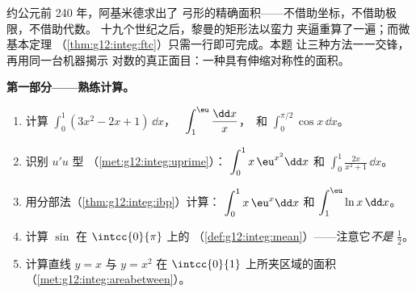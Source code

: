 \begin{problem}
\label{pb:g12:integ:1}
约公元前 240 年，阿基米德求出了
弓形的精确面积——不借助坐标，不借助极限，不借助代数。
十九个世纪之后，黎曼的矩形法以蛮力
夹逼重算了一遍；而微基本定理
（\cref{thm:g12:integ:ftc}）只需一行即可完成。本题
让三种方法一一交锋，再用同一台机器揭示
对数的真正面目：一种具有伸缩对称性的面积。

\medskip
\noindent\textbf{第一部分——熟练计算。}
\begin{enumerate}
  \item 计算 $\displaystyle\int_0^1 (3x^2 - 2x + 1)\,\dd x$，
        \ $\displaystyle\int_1^{\eu} \frac{\dd x}{x}$，\ 和
        $\displaystyle\int_0^{\pi/2} \cos x\,\dd x$。
  \item 识别 $u'u$ 型
        （\cref{met:g12:integ:uprime}）：
        $\displaystyle\int_0^1 x\,\eu^{x^2}\dd x$ 和
        $\displaystyle\int_0^1 \frac{2x}{x^2 + 1}\,\dd x$。
  \item 用分部法（\cref{thm:g12:integ:ibp}）计算：
        $\displaystyle\int_0^1 x\,\eu^x \dd x$ 和
        $\displaystyle\int_1^{\eu} \ln x\,\dd x$。
  \item 计算 $\sin$ 在
        $\intcc{0}{\pi}$ 上的
        （\cref{def:g12:integ:mean}）——注意它\emph{不是}
        $\frac12$。
  \item 计算直线 $y = x$ 与
         $y = x^2$ 在 $\intcc{0}{1}$ 上所夹区域的面积
        （\cref{met:g12:integ:areabetween}）。
\end{enumerate}


\end{problem}
